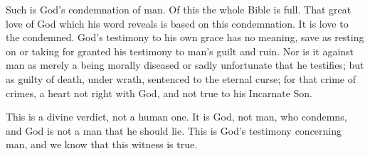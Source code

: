 \documentclass[
]{book}
\begin{document}
Such is God's condemnation of man. Of this the whole Bible is full. That great love of God which his word reveals is based on this condemnation. It is love to the condemned. God's testimony to his own grace has no meaning, save as resting on or taking for granted his testimony to man's guilt and ruin. Nor is it against man as merely a being morally diseased or sadly unfortunate that he testifies; but as guilty of death, under wrath, sentenced to the eternal curse; for that crime of crimes, a heart not right with God, and not true to his Incarnate Son.

This is a divine verdict, not a human one. It is God, not man, who condemns, and God is not a man that he should lie. This is God's testimony concerning man, and we know that this witness is true.
\end{document}
